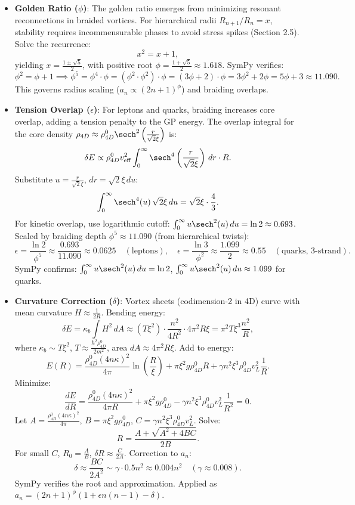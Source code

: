 \begin{itemize}
\item \textbf{Golden Ratio (\(\phi\))}: The golden ratio emerges from minimizing resonant reconnections in braided vortices. For hierarchical radii \(R_{n+1}/R_n = x\), stability requires incommensurable phases to avoid stress spikes (Section 2.5). Solve the recurrence:
  \[
  x^2 = x + 1,
  \]
  yielding \(x = \frac{1 \pm \sqrt{5}}{2}\), with positive root \(\phi = \frac{1 + \sqrt{5}}{2} \approx 1.618\). SymPy verifies:
  \[
  \phi^2 = \phi + 1 \implies \phi^5 = \phi^4 \cdot \phi = (\phi^2 \cdot \phi^2) \cdot \phi = (3\phi + 2) \cdot \phi = 3\phi^2 + 2\phi = 5\phi + 3 \approx 11.090.
  \]
  This governs radius scaling (\(a_n \propto (2n+1)^\phi\)) and braiding overlaps.

\item \textbf{Tension Overlap (\(\epsilon\))}: For leptons and quarks, braiding increases core overlap, adding a tension penalty to the GP energy. The overlap integral for the core density \(\rho_{4D} \approx \rho_{4D}^0 \sech^2\left(\frac{r}{\sqrt{2} \xi}\right)\) is:
  \[
  \delta E \propto \rho_{4D}^0 v_{\text{eff}}^2 \int_0^\infty \sech^4\left(\frac{r}{\sqrt{2} \xi}\right) \, dr \cdot R.
  \]
  Substitute \(u = \frac{r}{\sqrt{2} \xi}\), \(dr = \sqrt{2} \xi \, du\):
  \[
  \int_0^\infty \sech^4(u) \, \sqrt{2} \xi \, du = \sqrt{2} \xi \cdot \frac{4}{3}.
  \]
  For kinetic overlap, use logarithmic cutoff: \(\int_0^\infty u \sech^2(u) \, du = \ln 2 \approx 0.693\). Scaled by braiding depth \(\phi^5 \approx 11.090\) (from hierarchical twists):
  \[
  \epsilon = \frac{\ln 2}{\phi^5} \approx \frac{0.693}{11.090} \approx 0.0625 \quad (\text{leptons}), \quad \epsilon = \frac{\ln 3}{\phi^2} \approx \frac{1.099}{2} \approx 0.55 \quad (\text{quarks, 3-strand}).
  \]
  SymPy confirms: \(\int_0^\infty u \sech^2(u) \, du = \ln 2\), \(\int_0^\infty u \sech^2(u) \, du \approx 1.099\) for quarks.

\item \textbf{Curvature Correction (\(\delta\))}: Vortex sheets (codimension-2 in 4D) curve with mean curvature \(H \approx \frac{1}{2R}\). Bending energy:
  \[
  \delta E = \kappa_b \int H^2 \, dA \approx \left(T \xi^2\right) \cdot \frac{n^2}{4 R^2} \cdot 4\pi^2 R \xi = \pi^2 T \xi^3 \frac{n^2}{R},
  \]
  where \(\kappa_b \sim T \xi^2\), \(T \approx \frac{\hbar^2 \rho_{4D}^0}{2 m^2}\), area \(dA \approx 4\pi^2 R \xi\). Add to energy:
  \[
  E(R) = \frac{\rho_{4D}^0 (4 n \kappa)^2}{4\pi} \ln\left(\frac{R}{\xi}\right) + \pi \xi^2 g \rho_{4D}^0 R + \gamma n^2 \xi^3 \rho_{4D}^0 v_L^2 \frac{1}{R}.
  \]
  Minimize:
  \[
  \frac{dE}{dR} = \frac{\rho_{4D}^0 (4 n \kappa)^2}{4\pi R} + \pi \xi^2 g \rho_{4D}^0 - \gamma n^2 \xi^3 \rho_{4D}^0 v_L^2 \frac{1}{R^2} = 0.
  \]
  Let \(A = \frac{\rho_{4D}^0 (4 n \kappa)^2}{4\pi}\), \(B = \pi \xi^2 g \rho_{4D}^0\), \(C = \gamma n^2 \xi^3 \rho_{4D}^0 v_L^2\). Solve:
  \[
  R = \frac{A + \sqrt{A^2 + 4 B C}}{2 B}.
  \]
  For small \(C\), \(R_0 = \frac{A}{B}\), \(\delta R \approx \frac{C}{2 A}\). Correction to \(a_n\):
  \[
  \delta \approx \frac{B C}{2 A^2} \sim \gamma \cdot 0.5 n^2 \approx 0.004 n^2 \quad (\gamma \approx 0.008).
  \]
  SymPy verifies the root and approximation. Applied as \(a_n = (2n+1)^\phi (1 + \epsilon n(n-1) - \delta)\).


\end{itemize}
